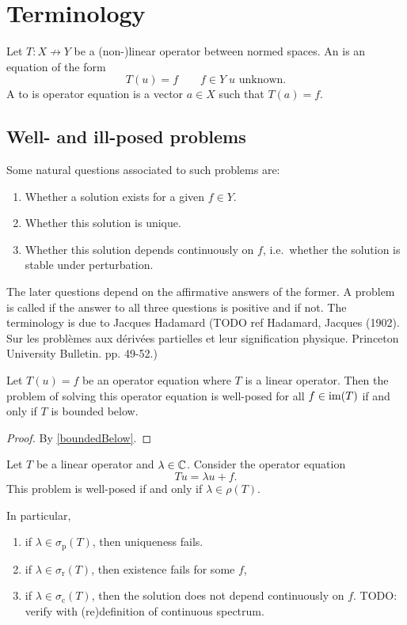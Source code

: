 \section{Terminology}
\begin{definition}
Let $T: X\not\to Y$ be a (non-)linear operator between normed spaces. An  is an equation of the form
\[ T(u) = f \qquad f\in Y\; \text{$u$ unknown.} \]
A  to is operator equation is a vector $a\in X$ such that $T(a) = f$.
\end{definition}
\subsection{Well- and ill-posed problems}
Some natural questions associated to such problems are:
\begin{enumerate}
\item Whether a solution exists for a given $f\in Y$.
\item Whether this solution is unique.
\item Whether this solution depends continuously on $f$, i.e.\ whether the solution is stable under perturbation.
\end{enumerate}
The later questions depend on the affirmative answers of the former. A problem is called  if the answer to all three questions is positive and  if not. The terminology is due to Jacques Hadamard (TODO ref Hadamard, Jacques (1902). Sur les problèmes aux dérivées partielles et leur signification physique. Princeton University Bulletin. pp. 49-52.)

\begin{proposition}
Let $ T(u) = f$ be an operator equation where $T$ is a linear operator. Then the problem of solving this operator equation is well-posed for all $f\in\operatorname{im}(T)$ \textup{if and only if} $T$ is bounded below.
\end{proposition}
\begin{proof}
By \ref{boundedBelow}.
\end{proof}

\begin{proposition}
Let $T$ be a linear operator and $\lambda \in \mathbb{C}$. Consider the operator equation
\[  Tu = \lambda u + f. \]
This problem is well-posed if and only if $\lambda\in \rho(T)$.

In particular, 
\begin{enumerate}
\item if $\lambda\in\sigma_\text{p}(T)$, then uniqueness fails.
\item if $\lambda\in\sigma_\text{r}(T)$, then existence fails for some $f$,
\item if $\lambda\in\sigma_\text{c}(T)$, then the solution does not depend continuously on $f$. TODO: verify with (re)definition of continuous spectrum.
\end{enumerate}
\end{proposition}

